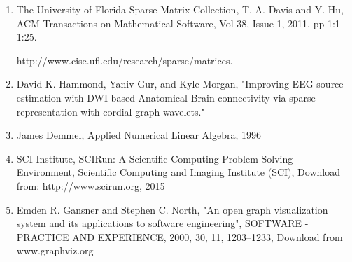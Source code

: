 \documentclass[11pt, oneside]{article}   	%
\begin{document}
\begin{enumerate}

\item The University of Florida Sparse Matrix Collection, T. A. Davis and Y. Hu, ACM Transactions on Mathematical Software, Vol 38, Issue 1, 2011, pp 1:1 - 1:25. 

http://www.cise.ufl.edu/research/sparse/matrices.

\item David K. Hammond, Yaniv Gur, and Kyle Morgan, "Improving EEG source estimation with DWI-based Anatomical Brain connectivity via sparse representation with cordial graph wavelets."

\item James Demmel, Applied Numerical Linear Algebra, 1996

\item SCI Institute, SCIRun: A Scientific Computing Problem Solving Environment, Scientific Computing and Imaging Institute (SCI), Download from: http://www.scirun.org, 2015

\item Emden R. Gansner and Stephen C. North, "An open graph visualization system and its applications to software engineering", SOFTWARE - PRACTICE AND EXPERIENCE, 2000, 30, 11, 1203--1233, Download from www.graphviz.org

\end{enumerate}
\end{document}
